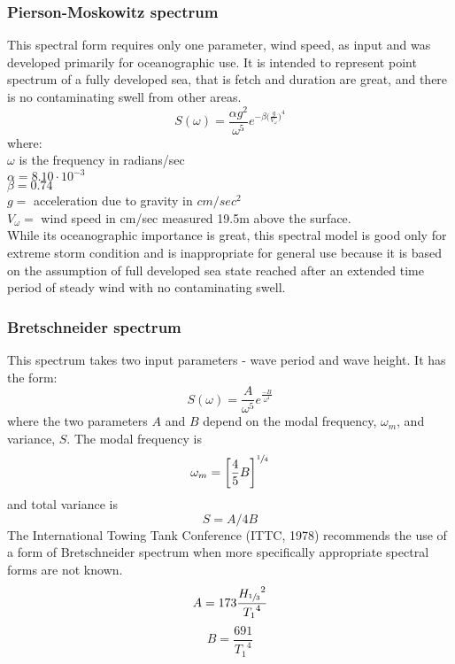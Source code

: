 \subsubsection{Pierson-Moskowitz spectrum} \label{Pierson-Moskowitz spectrum}
This spectral form requires only one parameter, wind speed, as input and was
developed primarily for oceanographic use. It is intended to represent point
spectrum of a fully developed sea, that is fetch and duration are great, and
there is no contaminating swell from other areas. 
\begin{equation}
  S(\omega) = \frac{\alpha g^2}{\omega^5} 
    e^{ -\beta \big(\frac{g}{V_{\omega}} \big)^4 }
  \label {eq: pierson moskowitz spectrum}
\end{equation}
where:\\
$\omega$ is the frequency in radians/sec\\
$\alpha = 8.10 \cdot 10^{-3}$\\
$\beta = 0.74$ \\
$g =$ acceleration due to gravity in $cm/sec^2$\\
$V_{\omega} =$ wind speed in cm/sec measured 19.5m above the surface.\\

While its oceanographic importance is great, this spectral model is good only
for extreme storm condition and is inappropriate for general use because it is
based on the assumption of full developed sea state reached after an extended
time period of steady wind with no contaminating swell. 

\subsubsection{Bretschneider spectrum} \label{Bretschneider spectrum}
This spectrum takes two input parameters - wave period and wave height. It has
the form:
\begin{equation}
  S(\omega) = \frac{A}{\omega^5} e^{\frac{-B}{\omega^4}}
  \label {eq: bretschneider spectrum}
\end{equation}
where the two parameters $A$ and $B$ depend on the modal frequency, $\omega_m$,
and variance, $S$. The modal frequency is
\begin{equation}
  \omega_m = \bigg[\frac{4}{5}B \bigg]^{\sfrac{1}{4}}
\end{equation}
and total variance is 
\begin{equation}
  S = A/4B
\end{equation}
The International Towing Tank Conference (ITTC, 1978) recommends the use of a
form of Bretschneider spectrum when more specifically appropriate spectral forms
are not known. 
\begin{equation}
  A = 173 \frac{{H_{\sfrac{1}{3}}}^2 }{{T_1}^4}
\end{equation}
\begin{equation}
  B = \frac{691}{{T_1}^4} 
\end{equation}

